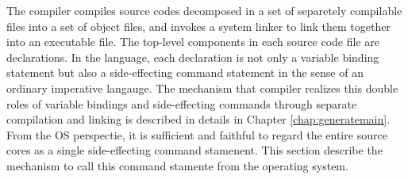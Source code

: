 	The \smlsharp{} compiler compiles source codes decomposed in a
set of separetely compilable files into a set of object files, and
invokes a system linker to link them together into an executable file.
	The top-level components in each source code file are 
declarations.
	In the \smlsharp{} language, each declaration is not only a
variable binding statement but also a side-effecting command 
statement in the sense of an ordinary imperative langauge.
	The mechanism that \smlsharp{} compiler realizes this double
roles of variable bindings and side-effecting commands through separate
compilation and linking is described in details in Chapter
\ref{chap:generatemain}.
	From the OS perspectie, it is sufficient and faithful to regard
the entire \smlsharp{} source cores as a single side-effecting command
stamenent.
	This section describe the mechanism to call this command
stamente from the operating system.
\fi%

